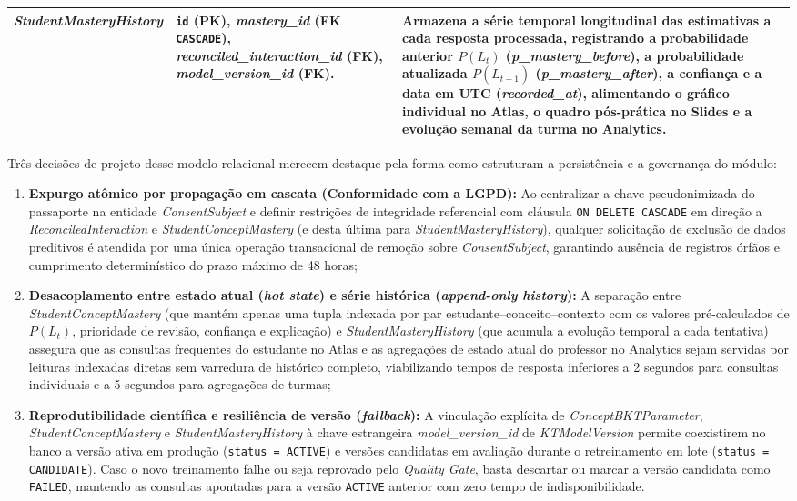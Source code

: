 {\begin{longtable}{>{\raggedright\arraybackslash}p{3.4cm}>{\raggedright\arraybackslash}p{4.2cm}>{\raggedright\arraybackslash}p{6.2cm}}
\hline
\textit{StudentMastery\allowbreak History} & \texttt{id} (PK), \textit{mastery\_id} (FK \texttt{CASCADE}), \textit{reconciled\_interaction\_id} (FK), \textit{model\_version\_id} (FK). & Armazena a série temporal longitudinal das estimativas a cada resposta processada, registrando a probabilidade anterior $P(L_t)$ (\textit{p\_mastery\_before}), a probabilidade atualizada $P(L_{t+1})$ (\textit{p\_mastery\_after}), a confiança e a data em UTC (\textit{recorded\_at}), alimentando o gráfico individual no Atlas, o quadro pós-prática no Slides e a evolução semanal da turma no Analytics. \\
\hline
\end{longtable}
}

Três decisões de projeto desse modelo relacional merecem destaque pela forma como estruturam a persistência e a governança do módulo:
\begin{enumerate}
    \item \textbf{Expurgo atômico por propagação em cascata (Conformidade com a LGPD):} Ao centralizar a chave pseudonimizada do passaporte na entidade \textit{ConsentSubject} e definir restrições de integridade referencial com cláusula \texttt{ON DELETE CASCADE} em direção a \textit{ReconciledInteraction} e \textit{StudentConceptMastery} (e desta última para \textit{StudentMasteryHistory}), qualquer solicitação de exclusão de dados preditivos é atendida por uma única operação transacional de remoção sobre \textit{ConsentSubject}, garantindo ausência de registros órfãos e cumprimento determinístico do prazo máximo de 48 horas;
    \item \textbf{Desacoplamento entre estado atual (\textit{hot state}) e série histórica (\textit{append-only history}):} A separação entre \textit{StudentConceptMastery} (que mantém apenas uma tupla indexada por par estudante--conceito--contexto com os valores pré-calculados de $P(L_t)$, prioridade de revisão, confiança e explicação) e \textit{StudentMasteryHistory} (que acumula a evolução temporal a cada tentativa) assegura que as consultas frequentes do estudante no Atlas e as agregações de estado atual do professor no Analytics sejam servidas por leituras indexadas diretas sem varredura de histórico completo, viabilizando tempos de resposta inferiores a 2 segundos para consultas individuais e a 5 segundos para agregações de turmas;
    \item \textbf{Reprodutibilidade científica e resiliência de versão (\textit{fallback}):} A vinculação explícita de \textit{ConceptBKTParameter}, \textit{StudentConceptMastery} e \textit{StudentMasteryHistory} à chave estrangeira \textit{model\_version\_id} de \textit{KTModelVersion} permite coexistirem no banco a versão ativa em produção (\texttt{status = ACTIVE}) e versões candidatas em avaliação durante o retreinamento em lote (\texttt{status = CANDIDATE}). Caso o novo treinamento falhe ou seja reprovado pelo \textit{Quality Gate}, basta descartar ou marcar a versão candidata como \texttt{FAILED}, mantendo as consultas apontadas para a versão \texttt{ACTIVE} anterior com zero tempo de indisponibilidade.
\end{enumerate}


